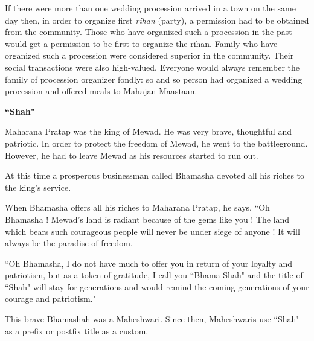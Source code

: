 If there were more than one wedding procession arrived in a town on the same
day then, in order to organize first \textit{rihan} (party), a permission had
to be obtained from the community. Those who have organized such a procession
in the past would get a permission to be first to organize the rihan. Family
who have organized such a procession were considered superior in the community.
Their social transactions were also high-valued. Everyone would always remember
the family of procession organizer fondly: so and so person had organized a
wedding procession and offered meals to Mahajan-Maastaan.
\begin{framed}
\begin{center}\textbf{``Shah"}\end{center}

Maharana Pratap was the king of Mewad. He was very brave, thoughtful and
patriotic. In order to protect the freedom of Mewad, he went to the
battleground. However, he had to leave Mewad as his resources started to run
out. 

At this time a prosperous businessman called Bhamasha devoted all his riches to
the king's service.

When Bhamasha offers all his riches to Maharana Pratap, he says, ``Oh Bhamasha !
Mewad's land is radiant because of the gems like you ! The land which bears
such courageous people will never be under siege of anyone ! It will always
be the paradise of freedom.

``Oh Bhamasha, I do not have much to offer you in return of your loyalty and
patriotism, but as a token of gratitude, I call you ``Bhama Shah" and the title
of ``Shah" will stay for generations and would remind the coming generations of
your courage and patriotism."

This brave Bhamashah was a Maheshwari. Since then, Maheshwaris use ``Shah" as a
prefix or postfix title as a custom.

\end{framed}
